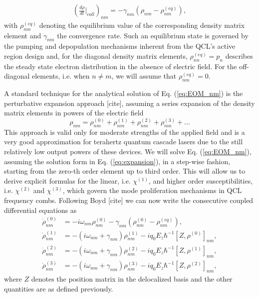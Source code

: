 \documentclass[journal]{IEEEtran}
\begin{document}
\begin{align}
(\frac{d \rho }{dt}|_{coll})_{nm} = -\gamma_{nm}(\rho_{nm}-\rho_{nm}^{(eq)}),
\end{align}
with $\rho_{nm}^{(eq)}$ denoting the equilibrium value of the corresponding density matrix element and $\gamma_{nm}$ the convergence rate. Such an equilibrium state is governed by the pumping and depopulation mechanisms inherent from the QCL's active region design and, for the diagonal density matrix elements, $\rho_{nn}^{(eq)} = p_n$ describes the steady state electron distribution in the absence of electric field. For the off-diagonal elements, i.e. when $n\neq m$, we will assume that  $\rho_{nm}^{(eq)} = 0$. 

A standard technique for the analytical solution of Eq. (\ref{eq:EOM_nm}) is the perturbative expansion approach [cite], assuming a series expansion of the density matrix elements in powers of the electric field
\begin{equation}
\label{eq:expansion}
\rho_{nm} = \rho_{nm}^{(0)}+\rho_{nm}^{(1)}+\rho_{nm}^{(2)} +\rho_{nm}^{(3)} + ...
\end{equation} 
This approach is valid only for moderate strengths of the applied field and is a very good approximation for terahertz quantum cascade lasers due to the still relatively low output powers of these devices. We will solve Eq. (\ref{eq:EOM_nm}), assuming the solution form in Eq. (\ref{eq:expansion}), in a step-wise fashion, starting from the zero-th order element up to third order. This will allow us to derive explicit formulas for the linear, i.e. $\chi^{(1)}$, and higher order susceptibilities, i.e. $\chi^{(2)}$ and $\chi^{(3)}$, which govern the mode proliferation mechanisms in QCL frequency combs. Following Boyd [cite] we can now write the consecutive coupled differential equations as 
\begin{subequations}
\label{eq:EOM_expansion_nm}
\begin{align}
\dot{\rho}_{nm}^{(0)} &= -i\omega_{nm}\rho_{nm}^{(0)} -\gamma_{nm}(\rho_{nm}^{(0)}-\rho_{nm}^{(eq)}), \label{eq:EOM_zeroth}\\
\dot{\rho}_{nm}^{(1)} &= -(i\omega_{nm}+\gamma_{nm})\rho_{nm}^{(1)}  - i q_0E_z\hbar^{-1}[Z,\rho^{(0)}]_{nm}, \label{eq:EOM_first}\\
\dot{\rho}_{nm}^{(2)} &= -(i\omega_{nm}+\gamma_{nm})\rho_{nm}^{(2)}  - i q_0E_z\hbar^{-1}[Z,\rho^{(1)}]_{nm},  \label{eq:EOM_second}\\
\dot{\rho}_{nm}^{(3)} &= -(i\omega_{nm}+\gamma_{nm})\rho_{nm}^{(3)}  - i q_0E_z\hbar^{-1}[Z,\rho^{(2)}]_{nm},  \label{eq:EOM_third}
\end{align} 
\end{subequations}
where $Z$ denotes the position matrix in the delocalized basis and the other quantities are as defined previously.  
\end{document}
